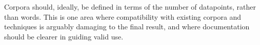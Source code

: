 Corpora should, ideally, be defined in terms of the number of datapoints, rather than words.  This is one area where compatibility with existing corpora and techniques is arguably damaging to the final result, and where documentation should be clearer in guiding valid use.













